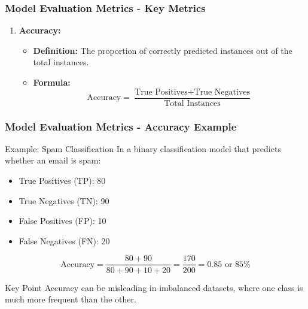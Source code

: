 \documentclass[aspectratio=169]{beamer}
\begin{document}
\begin{frame}[fragile]
    \frametitle{Model Evaluation Metrics - Key Metrics}
    \begin{enumerate}
        \item \textbf{Accuracy:}
            \begin{itemize}
                \item \textbf{Definition:} The proportion of correctly predicted instances out of the total instances.
                \item \textbf{Formula:}
                  \begin{equation}
                  \text{Accuracy} = \frac{\text{True Positives} + \text{True Negatives}}{\text{Total Instances}} 
                  \end{equation}
            \end{itemize}
    \end{enumerate}
\end{frame}

\begin{frame}[fragile]
    \frametitle{Model Evaluation Metrics - Accuracy Example}
    \begin{block}{Example: Spam Classification}
        In a binary classification model that predicts whether an email is spam:
        \begin{itemize}
            \item True Positives (TP): 80
            \item True Negatives (TN): 90
            \item False Positives (FP): 10
            \item False Negatives (FN): 20
        \end{itemize}
        \begin{equation}
        \text{Accuracy} = \frac{80 + 90}{80 + 90 + 10 + 20} = \frac{170}{200} = 0.85 \text{ or } 85\%
        \end{equation}
        \begin{block}{Key Point}
            Accuracy can be misleading in imbalanced datasets, where one class is much more frequent than the other.
        \end{block}
    \end{block}
\end{frame}
\end{document}
